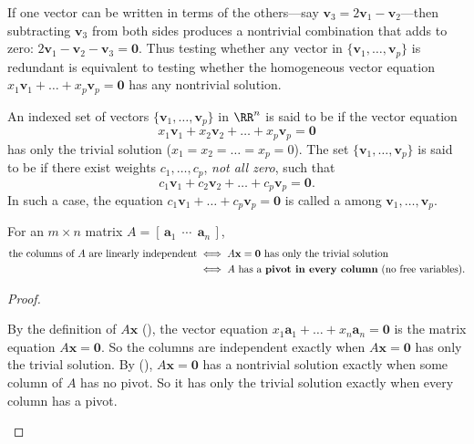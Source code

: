 \documentclass[10pt]{scrartcl}
\newcommand{\vv}[1]{\mathbf{#1}}
\begin{document}
If one vector can be written in terms of the others---say $\vv v_3=2\vv v_1-\vv v_2$---then subtracting $\vv v_3$ from both sides produces a nontrivial combination that adds to zero: $2\vv v_1-\vv v_2-\vv v_3=\vv 0$. Thus testing whether any vector in $\{\vv v_1,\dots,\vv v_p\}$ is redundant is equivalent to testing whether the homogeneous vector equation $x_1\vv v_1+\dots+x_p\vv v_p=\vv 0$ has any nontrivial solution.

\begin{definition*}
  An indexed set of vectors $\{\vv v_1,\dots,\vv v_p\}$ in $\RR^n$ is said to be  if the vector equation
  \[
    x_1\vv v_1 + x_2\vv v_2 + \dots + x_p\vv v_p = \vv 0
  \]
  has only the trivial solution ($x_1=x_2=\dots=x_p=0$). The set $\{\vv v_1,\dots,\vv v_p\}$ is said to be  if there exist weights $c_1,\dots,c_p$, \emph{not all zero}, such that
  \[
    c_1\vv v_1 + c_2\vv v_2 + \dots + c_p\vv v_p = \vv 0.
  \]
  In such a case, the equation $c_1\vv v_1+\dots+c_p\vv v_p=\vv 0$ is called a  among $\vv v_1,\dots,\vv v_p$.
\end{definition*}

\begin{proposition*}
  For an $m\times n$ matrix $A=[\,\vv a_1\ \ \cdots\ \ \vv a_n\,]$,
  \begin{align*}
    \text{the columns of }A\text{ are linearly independent} &\iff A\vv x=\vv 0\text{ has only the trivial solution} \\*
    &\iff A\text{ has a \textbf{pivot in every column} (no free variables).}
  \end{align*}
\end{proposition*}
\begin{proof}
  \begin{steps}
    \ii By the definition of $A\vv x$ (), the vector equation $x_1\vv a_1+\dots+x_n\vv a_n=\vv 0$ is the matrix equation $A\vv x=\vv 0$. So the columns are independent exactly when $A\vv x=\vv 0$ has only the trivial solution.
    \ii By (), $A\vv x=\vv 0$ has a nontrivial solution exactly when some column of $A$ has no pivot. So it has only the trivial solution exactly when every column has a pivot.
  \end{steps}
\end{proof}
\end{document}
